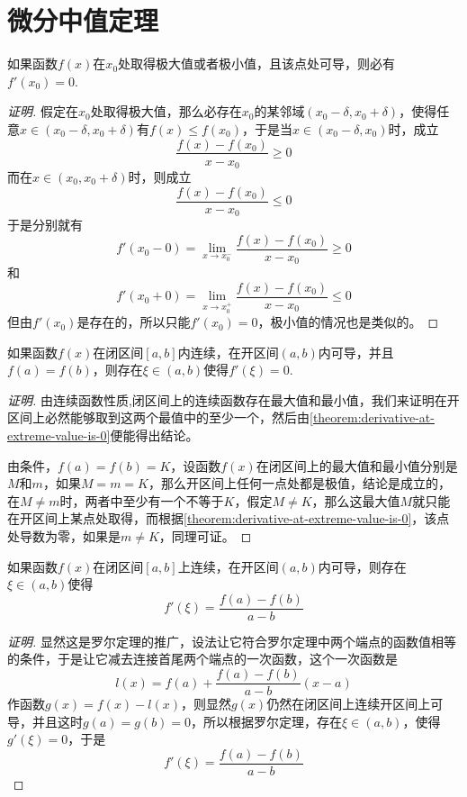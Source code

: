 
\section{微分中值定理}
\label{sec:differential-mean-value-theorems}

\begin{theorem}
  \label{theorem:derivative-at-extreme-value-is-0}
  如果函数$f(x)$在$x_0$处取得极大值或者极小值，且该点处可导，则必有$f'(x_0)=0$.
\end{theorem}

\begin{proof}[证明]
  假定在$x_0$处取得极大值，那么必存在$x_0$的某邻域$(x_0-\delta,x_0+\delta)$，使得任意$x \in (x_0-\delta,x_0+\delta)$有$f(x) \leqslant f(x_0)$，于是当$x \in (x_0-\delta, x_0)$时，成立
  \[ \frac{f(x)-f(x_0)}{x-x_0} \geqslant 0 \]
  而在$x \in (x_0,x_0+\delta)$时，则成立
  \[ \frac{f(x)-f(x_0)}{x-x_0} \leqslant 0 \]
  于是分别就有
  \[ f'(x_0-0) = \lim_{x \to x_0^-} \frac{f(x)-f(x_0)}{x-x_0} \geqslant 0 \]
  和
  \[ f'(x_0+0) = \lim_{x \to x_0^+} \frac{f(x)-f(x_0)}{x-x_0} \leqslant 0 \]
  但由$f'(x_0)$是存在的，所以只能$f'(x_0)=0$，极小值的情况也是类似的。
\end{proof}

\begin{theorem}
  如果函数$f(x)$在闭区间$[a,b]$内连续，在开区间$(a,b)$内可导，并且$f(a)=f(b)$，则存在$ \xi \in (a,b)$使得$f'(\xi)=0$.
\end{theorem}

\begin{proof}[证明]
  由连续函数性质,闭区间上的连续函数存在最大值和最小值，我们来证明在开区间上必然能够取到这两个最值中的至少一个，然后由\autoref{theorem:derivative-at-extreme-value-is-0}便能得出结论。

  由条件，$f(a)=f(b)=K$，设函数$f(x)$在闭区间上的最大值和最小值分别是$M$和$m$，如果$M=m=K$，那么开区间上任何一点处都是极值，结论是成立的，在$M \neq m$时，两者中至少有一个不等于$K$，假定$M \neq K$，那么这最大值$M$就只能在开区间上某点处取得，而根据\autoref{theorem:derivative-at-extreme-value-is-0}，该点处导数为零，如果是$m \neq K$，同理可证。
\end{proof}

\begin{theorem}
  如果函数$f(x)$在闭区间$[a,b]$上连续，在开区间$(a,b)$内可导，则存在$\xi \in (a,b)$使得
  \[ f'(\xi) = \frac{f(a)-f(b)}{a-b} \]
\end{theorem}

\begin{proof}[证明]
  显然这是罗尔定理的推广，设法让它符合罗尔定理中两个端点的函数值相等的条件，于是让它减去连接首尾两个端点的一次函数，这个一次函数是
  \[ l(x) = f(a) + \frac{f(a)-f(b)}{a-b}(x-a) \]
  作函数$g(x)=f(x)-l(x)$，则显然$g(x)$仍然在闭区间上连续开区间上可导，并且这时$g(a)=g(b)=0$，所以根据罗尔定理，存在$\xi \in (a,b)$，使得$g'(\xi)=0$，于是
  \[ f'(\xi) = \frac{f(a)-f(b)}{a-b} \]
\end{proof}


